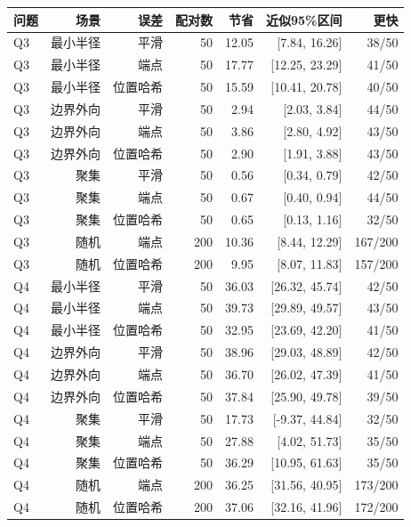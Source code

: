\begin{tabular}{lrrrrrr}
\toprule
问题 & 场景 & 误差 & 配对数 & 节省 & 近似95\%区间 & 更快 \\
\midrule
Q3 & 最小半径 & 平滑 & 50 & 12.05 & [7.84, 16.26] & 38/50 \\
Q3 & 最小半径 & 端点 & 50 & 17.77 & [12.25, 23.29] & 41/50 \\
Q3 & 最小半径 & 位置哈希 & 50 & 15.59 & [10.41, 20.78] & 40/50 \\
Q3 & 边界外向 & 平滑 & 50 & 2.94 & [2.03, 3.84] & 44/50 \\
Q3 & 边界外向 & 端点 & 50 & 3.86 & [2.80, 4.92] & 43/50 \\
Q3 & 边界外向 & 位置哈希 & 50 & 2.90 & [1.91, 3.88] & 43/50 \\
Q3 & 聚集 & 平滑 & 50 & 0.56 & [0.34, 0.79] & 42/50 \\
Q3 & 聚集 & 端点 & 50 & 0.67 & [0.40, 0.94] & 44/50 \\
Q3 & 聚集 & 位置哈希 & 50 & 0.65 & [0.13, 1.16] & 32/50 \\
Q3 & 随机 & 端点 & 200 & 10.36 & [8.44, 12.29] & 167/200 \\
Q3 & 随机 & 位置哈希 & 200 & 9.95 & [8.07, 11.83] & 157/200 \\
Q4 & 最小半径 & 平滑 & 50 & 36.03 & [26.32, 45.74] & 42/50 \\
Q4 & 最小半径 & 端点 & 50 & 39.73 & [29.89, 49.57] & 43/50 \\
Q4 & 最小半径 & 位置哈希 & 50 & 32.95 & [23.69, 42.20] & 41/50 \\
Q4 & 边界外向 & 平滑 & 50 & 38.96 & [29.03, 48.89] & 42/50 \\
Q4 & 边界外向 & 端点 & 50 & 36.70 & [26.02, 47.39] & 41/50 \\
Q4 & 边界外向 & 位置哈希 & 50 & 37.84 & [25.90, 49.78] & 39/50 \\
Q4 & 聚集 & 平滑 & 50 & 17.73 & [-9.37, 44.84] & 32/50 \\
Q4 & 聚集 & 端点 & 50 & 27.88 & [4.02, 51.73] & 35/50 \\
Q4 & 聚集 & 位置哈希 & 50 & 36.29 & [10.95, 61.63] & 35/50 \\
Q4 & 随机 & 端点 & 200 & 36.25 & [31.56, 40.95] & 173/200 \\
Q4 & 随机 & 位置哈希 & 200 & 37.06 & [32.16, 41.96] & 172/200 \\
\bottomrule
\end{tabular}
